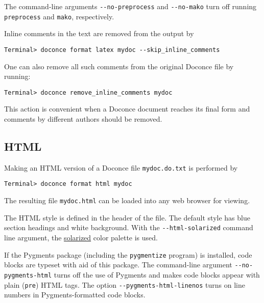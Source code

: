 \documentclass[%
oneside,                 %
final,                   %
10pt]{article}
\begin{document}
The command-line arguments {\fontsize{10pt}{10pt}\Verb!--no-preprocess!} and {\fontsize{10pt}{10pt}\Verb!--no-mako!} turn off
running {\fontsize{10pt}{10pt}\Verb!preprocess!} and {\fontsize{10pt}{10pt}\Verb!mako!}, respectively.

Inline comments in the text are removed from the output by
\vspace{4pt}
\begin{Verbatim}[numbers=none,frame=lines,label=\fbox{{\tiny Terminal}},fontsize=\fontsize{9pt}{9pt},
labelposition=topline,framesep=2.5mm,framerule=0.7pt]
Terminal> doconce format latex mydoc --skip_inline_comments
\end{Verbatim}
One can also remove all such comments from the original Doconce
file by running:
\begin{Verbatim}[fontsize=\fontsize{9pt}{9pt},tabsize=8,baselinestretch=0.85,
fontfamily=tt,xleftmargin=7mm]
Terminal> doconce remove_inline_comments mydoc
\end{Verbatim}
\noindent
This action is convenient when a Doconce document reaches its final form
and comments by different authors should be removed.

\subsection{HTML}

Making an HTML version of a Doconce file {\fontsize{10pt}{10pt}\Verb!mydoc.do.txt!}
is performed by
\vspace{4pt}
\begin{Verbatim}[numbers=none,frame=lines,label=\fbox{{\tiny Terminal}},fontsize=\fontsize{9pt}{9pt},
labelposition=topline,framesep=2.5mm,framerule=0.7pt]
Terminal> doconce format html mydoc
\end{Verbatim}
The resulting file {\fontsize{10pt}{10pt}\Verb!mydoc.html!} can be loaded into any web browser for viewing.

The HTML style is defined in the header of the file. The default style
has blue section headings and white background. With the {\fontsize{10pt}{10pt}\Verb!--html-solarized!}
command line argument, the \href{{http://ethanschoonover.com/solarized}}{solarized}
color palette is used.

If the Pygments package (including the {\fontsize{10pt}{10pt}\Verb!pygmentize!} program)
is installed, code blocks are typeset with
aid of this package. The command-line argument {\fontsize{10pt}{10pt}\Verb!--no-pygments-html!}
turns off the use of Pygments and makes code blocks appear with
plain ({\fontsize{10pt}{10pt}\Verb!pre!}) HTML tags. The option {\fontsize{10pt}{10pt}\Verb!--pygments-html-linenos!} turns
on line numbers in Pygments-formatted code blocks.
\end{document}
